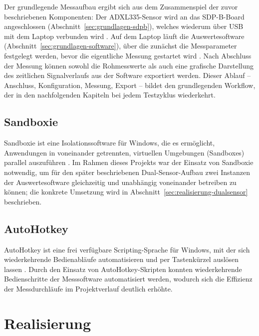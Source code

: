 Der grundlegende Messaufbau ergibt sich aus dem Zusammenspiel der zuvor beschriebenen Komponenten: Der ADXL335-Sensor wird an das SDP-B-Board angeschlossen (Abschnitt~\ref{sec:grundlagen-sdpb}), welches wiederum über USB mit dem Laptop verbunden wird \cite{ADI_UG277}. Auf dem Laptop läuft die Auswertesoftware (Abschnitt~\ref{sec:grundlagen-software}), über die zunächst die Messparameter festgelegt werden, bevor die eigentliche Messung gestartet wird \cite{ADI_UG2190}. Nach Abschluss der Messung können sowohl die Rohmesswerte als auch eine grafische Darstellung des zeitlichen Signalverlaufs aus der Software exportiert werden. Dieser Ablauf -- Anschluss, Konfiguration, Messung, Export -- bildet den grundlegenden Workflow, der in den nachfolgenden Kapiteln bei jedem Testzyklus wiederkehrt.

\section{Sandboxie}
\label{sec:grundlagen-sandboxie}

Sandboxie ist eine Isolationssoftware für Windows, die es ermöglicht, Anwendungen in voneinander getrennten, virtuellen Umgebungen (Sandboxes) parallel auszuführen \cite{Sandboxie2026}. Im Rahmen dieses Projekts war der Einsatz von Sandboxie notwendig, um für den später beschriebenen Dual-Sensor-Aufbau zwei Instanzen der Auswertesoftware gleichzeitig und unabhängig voneinander betreiben zu können; die konkrete Umsetzung wird in Abschnitt~\ref{sec:realisierung-dualsensor} beschrieben.

\section{AutoHotkey}
\label{sec:grundlagen-autohotkey}

AutoHotkey ist eine frei verfügbare Scripting-Sprache für Windows, mit der sich wiederkehrende Bedienabläufe automatisieren und per Tastenkürzel auslösen lassen \cite{AutoHotkey2026}. Durch den Einsatz von AutoHotkey-Skripten konnten wiederkehrende Bedienschritte der Messsoftware automatisiert werden, wodurch sich die Effizienz der Messdurchläufe im Projektverlauf deutlich erhöhte.

\chapter{Realisierung}
\label{sec:realisierung}

